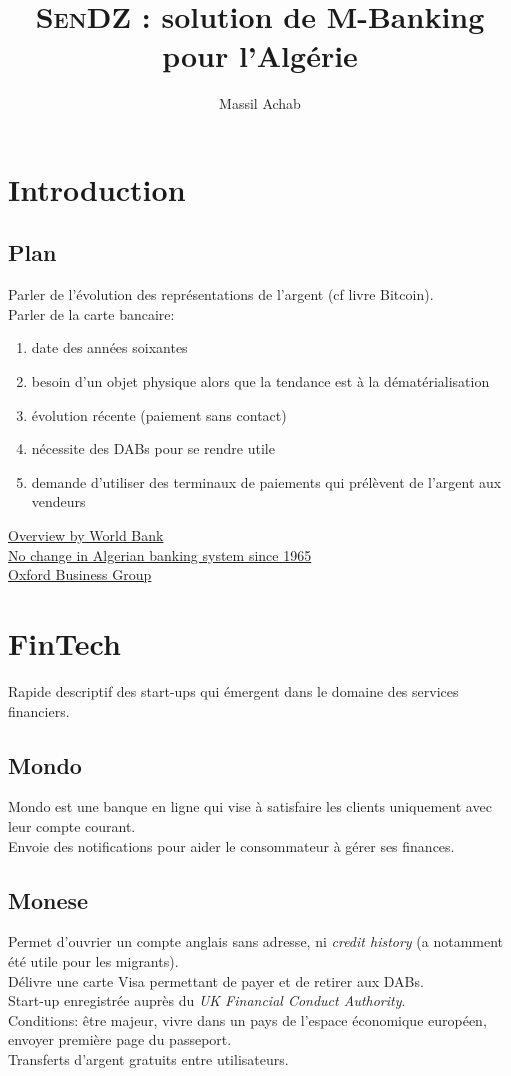 \documentclass{report}
\author{Massil Achab}
\title{\textsc{SenDZ} : solution de M-Banking pour l'Alg\'erie}
\begin{document}
\maketitle
\tableofcontents

\chapter{Introduction}
\section{Plan}
Parler de l'\'evolution des repr\'esentations de l'argent (cf livre Bitcoin). \\
Parler de la carte bancaire:
\begin{enumerate}
  \item date des ann\'ees soixantes
  \item besoin d'un objet physique alors que la tendance est à la d\'emat\'erialisation
  \item \'evolution r\'ecente (paiement sans contact)
  \item n\'ecessite des DABs pour se rendre utile
  \item demande d'utiliser des terminaux de paiements qui prélèvent de l'argent aux vendeurs
\end{enumerate}
\href{http://www.worldbank.org/en/country/algeria/overview}{Overview by World Bank} \\
\href{https://www.linkedin.com/pulse/why-change-algerian-banking-system-since-1965-zahir-serrai}{No change in Algerian banking system since 1965} \\
\href{https://www.oxfordbusinessgroup.com/country/algeria}{Oxford Business Group}

\chapter{FinTech}
Rapide descriptif des start-ups qui émergent dans le domaine des services financiers.
\section{Mondo}
Mondo est une banque en ligne qui vise à satisfaire les clients uniquement avec leur compte courant. \\
Envoie des notifications pour aider le consommateur à gérer ses finances.
\section{Monese}
Permet d'ouvrier un compte anglais sans adresse, ni \emph{credit history} (a notamment été utile pour les migrants). \\
Délivre une carte Visa permettant de payer et de retirer aux DABs. \\
Start-up enregistrée auprès du \emph{UK Financial Conduct Authority}. \\
Conditions: être majeur, vivre dans un pays de l'espace économique européen, envoyer première page du passeport. \\
Transferts d'argent gratuits entre utilisateurs.
\end{document}
